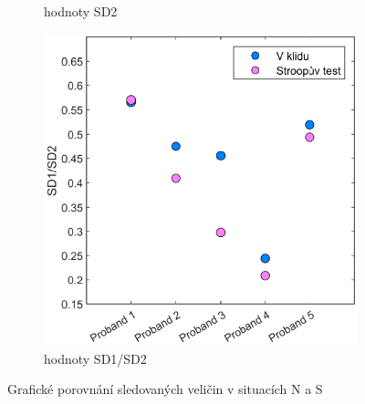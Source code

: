 \begin{figure}[H]
\begin{subfigure}[b]{0.45\textwidth}
		\caption{hodnoty SD2}
		\label{fig:results_sd2}
	\end{subfigure}
	\par\bigskip
	\begin{subfigure}[b]{0.45\textwidth}
		\centering
		\includegraphics[width=0.9\linewidth]{../assets/figures/results_sd1sd2}
		\caption{hodnoty SD1/SD2}
		\label{fig:results_sd1sd2}
	\end{subfigure}
	\caption{Grafické porovnání sledovaných veličin v situacích N a S}
	\label{fig:results_sd_vals}
\end{figure}